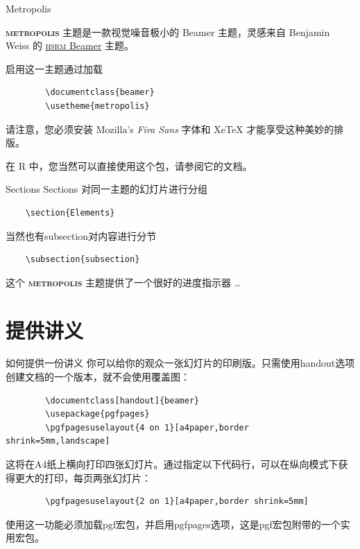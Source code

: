 \documentclass[10pt,UTF8]{ctexbeamer}
\newcommand{\themename}{\textbf{\textsc{metropolis}}\xspace}
\begin{document}
\begin{frame}[fragile]{Metropolis}
	
	\themename 主题是一款视觉噪音极小的 Beamer 主题，灵感来自 Benjamin Weiss 的 \href{https://github.com/hsrmbeamertheme/hsrmbeamertheme}{\textsc{hsrm} Beamer} 主题。
	
	启用这一主题通过加载
	
	\begin{verbatim}    
		\documentclass{beamer}
		\usetheme{metropolis}
	\end{verbatim}

   请注意，您必须安装 Mozilla's \emph{Fira Sans} 字体和 XeTeX 才能享受这种美妙的排版。
   
   \small{在 R 中，您当然可以直接使用这个包，请参阅它的文档。}
\end{frame}

\begin{frame}[fragile]{Sections}
  Sections 对同一主题的幻灯片进行分组

  \begin{verbatim}    
  	\section{Elements}
  \end{verbatim}

当然也有subsection对内容进行分节
  \begin{verbatim}
  	\subsection{subsection}
  \end{verbatim}
   这个 \themename 主题提供了一个很好的进度指示器 \ldots
  
\end{frame}

\section{提供讲义}
\begin{frame}[fragile]{如何提供一份讲义}
	你可以给你的观众一张幻灯片的印刷版。只需使用handout选项创建文档的一个版本，就不会使用覆盖图：
	\begin{verbatim}
		\documentclass[handout]{beamer}
		\usepackage{pgfpages}
		\pgfpagesuselayout{4 on 1}[a4paper,border shrink=5mm,landscape]
	\end{verbatim}
这将在A4纸上横向打印四张幻灯片。通过指定以下代码行，可以在纵向模式下获得更大的打印，每页两张幻灯片：
	\begin{verbatim}
		\pgfpagesuselayout{2 on 1}[a4paper,border shrink=5mm]
	\end{verbatim}
使用这一功能必须加载pgf宏包，并启用pgfpages选项，这是pgf宏包附带的一个实用宏包。
\end{frame}
\end{document}
